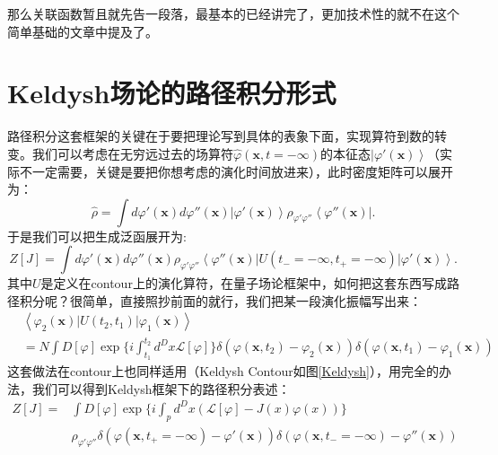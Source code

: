 \documentclass[12pt, a4paper, oneside]{ctexart}
\begin{document}
那么关联函数暂且就先告一段落，最基本的已经讲完了，更加技术性的就不在这个简单基础的文章中提及了。

\section{Keldysh场论的路径积分形式}
路径积分这套框架的关键在于要把理论写到具体的表象下面，实现算符到数的转变。我们可以考虑在无穷远过去的场算符$\hat\varphi(\bm x,t=-\infty)$的本征态$\left|  \varphi'(\bm x) \right>$（实际不一定需要，关键是要把你想考虑的演化时间放进来），此时密度矩阵可以展开为：
\begin{equation}
    \hat\rho=\int d\varphi'(\bm x)d\varphi''(\bm x)\left|  \varphi'(\bm x) \right>\rho_{\varphi'\varphi''}\left< \varphi''(\bm x)  \right|.
\end{equation}
于是我们可以把生成泛函展开为:
\begin{equation}
    Z[J]=\int d\varphi'(\bm x)d\varphi''(\bm x)\rho_{\varphi'\varphi''}\left< \varphi''(\bm x)  \right| U(t_-=-\infty,t_+=-\infty)\left|  \varphi'(\bm x) \right>.
\end{equation}
其中$U$是定义在contour上的演化算符，在量子场论框架中，如何把这套东西写成路径积分呢？很简单，直接照抄前面的就行，我们把某一段演化振幅写出来：
\begin{align}
    &\left< \varphi_2(\bm x) |U(t_2,t_1)| \varphi_1(\bm x) \right>\nonumber\\ 
    &=N\int D[\varphi]\exp\{ i\int_{t_1}^{t_2}d^Dx\mathcal{L}[\varphi]  \}\delta(\varphi(\bm x,t_2)-\varphi_2(\bm x))\delta(\varphi(\bm x,t_1)-\varphi_1(\bm x))
\end{align}
这套做法在contour上也同样适用（Keldysh Contour如图\ref{Keldysh}），用完全的办法，我们可以得到Keldysh框架下的路径积分表述：
\begin{align}
    Z[J]=&\int D[\varphi]\exp\{ i\int_pd^Dx(\mathcal{L}[\varphi] -J(x)\varphi(x)) \}\nonumber\\
    &\rho_{\varphi'\varphi''}\delta(\varphi(\bm x,t_+=-\infty)-\varphi'(\bm x))\delta(\varphi(\bm x,t_-=-\infty)-\varphi''(\bm x))
\end{align}
\end{document}
